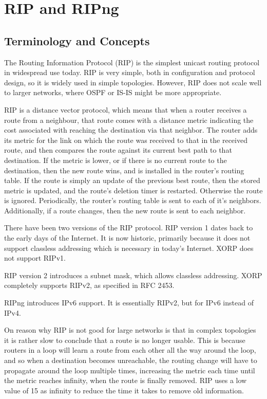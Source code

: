 \chapter{RIP and RIPng}
\label{rip}
\section{Terminology and Concepts}

The Routing Information Protocol (RIP) is the simplest unicast routing
protocol in widespread use today.  RIP is very simple, both in
configuration and protocol design, so it is widely used in simple
topologies.  However, RIP does not scale well to larger networks,
where OSPF or IS-IS might be more appropriate.

RIP is a distance vector protocol, which means that when a router
receives a route from a neighbour, that route comes with a distance
metric indicating the cost associated with reaching the destination
via that neighbor.  The router adds its metric for the link on which
the route was received to that in the received route, and then
compares the route against its current best path to that destination.
If the metric is lower, or if there is no current route to the
destination, then the new route wins, and is installed in the router's
routing table.  If the route is simply an update of the previous best
route, then the stored metric is updated, and the route's deletion
timer is restarted.  Otherwise the route is ignored.  Periodically,
the router's routing table is sent to each of it's neighbors.
Additionally, if a route changes, then the new route is sent to each
neighbor.

There have been two versions of the RIP protocol.  RIP version 1 dates
back to the early days of the Internet.  It is now historic, primarily
because it does not support classless addressing which is necessary in
today's Internet.  XORP does not support RIPv1.  

RIP version 2 introduces a subnet mask, which allows classless
addressing.  XORP completely supports RIPv2, as specified in RFC 2453.

RIPng introduces IPv6 support.  It is essentially RIPv2, but for IPv6
instead of IPv4.

On reason why RIP is not good for large networks is that in complex
topologies it is rather slow to conclude that a route is no longer
usable.  This is because routers in a loop will learn a route from
each other all the way around the loop, and so when a destination
becomes unreachable, the routing change will have to propagate around
the loop multiple times, increasing the metric each time until the
metric reaches infinity, when the route is finally removed.  RIP uses
a low value of 15 as infinity to reduce the time it takes to remove
old information.

